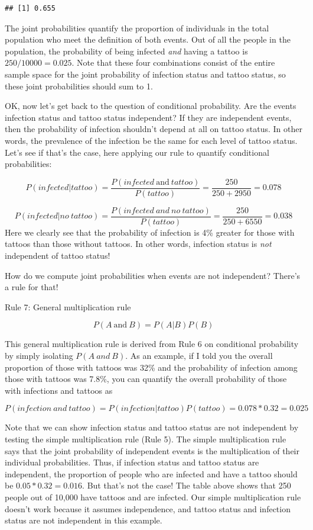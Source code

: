 \documentclass[
]{book}
\begin{document}
\begin{verbatim}
## [1] 0.655
\end{verbatim}

The joint probabilities quantify the proportion of individuals in the total population who meet the definition of both events. Out of all the people in the population, the probability of being infected \emph{and} having a tattoo is \(250/10000 = 0.025\). Note that these four combinations consist of the entire sample space for the joint probability of infection status and tattoo status, so these joint probabilities should sum to 1.

OK, now let's get back to the question of conditional probability. Are the events infection status and tattoo status independent? If they are independent events, then the probability of infection shouldn't depend at all on tattoo status. In other words, the prevalence of the infection be the same for each level of tattoo status. Let's see if that's the case, here applying our rule to quantify conditional probabilities:

\[
P(infected|tattoo) = \frac{P(infected\ \text{and}\ tattoo)}{P(tattoo)}=\frac{250}{250+2950}=0.078
\]

\[
P(infected|no\ tattoo) = \frac{P(infected\ and\ no\ tattoo)}{P(tattoo)}=\frac{250}{250+6550}=0.038
\]
Here we clearly see that the probability of infection is 4\% greater for those with tattoos than those without tattoos. In other words, infection status is \emph{not} independent of tattoo status!

How do we compute joint probabilities when events are not independent? There's a rule for that!

Rule 7: General multiplication rule

\[
P(A\ \text{and}\ B) = P(A|B)P(B)
\]

This general multiplication rule is derived from Rule 6 on conditional probability by simply isolating \(P(A\ and\ B)\). As an example, if I told you the overall proportion of those with tattoos was 32\% and the probability of infection among those with tattoos was 7.8\%, you can quantify the overall probability of those with infections and tattoos as

\[
P(infection\ and\ tattoo) = P(infection|tattoo)P(tattoo)=0.078*0.32=0.025
\]

Note that we can show infection status and tattoo status are not independent by testing the simple multiplication rule (Rule 5). The simple multiplication rule says that the joint probability of independent events is the multiplication of their individual probabilities. Thus, if infection status and tattoo status are independent, the proportion of people who are infected and have a tattoo should be \(0.05*0.32=0.016\). But that's not the case! The table above shows that 250 people out of 10,000 have tattoos and are infected. Our simple multiplication rule doesn't work because it assumes independence, and tattoo status and infection status are not independent in this example.
\end{document}

